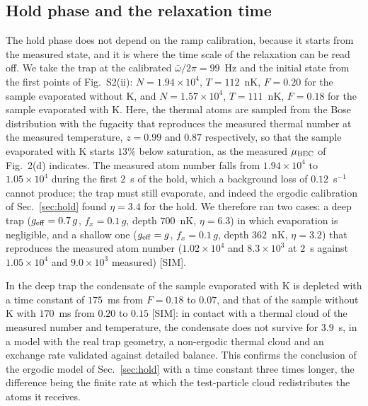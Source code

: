 \subsection{Hold phase and the relaxation time}
The hold phase does not depend on the ramp calibration, because it starts
from the measured state, and it is where the time scale of the relaxation
can be read off. We take the trap at the calibrated $\bar\omega/2\pi=99$~Hz
and the initial state from the first points of Fig.~S2(ii):
$N=1.94\times10^4$, $T=112$~nK, $F=0.20$ for the sample evaporated without
K, and $N=1.57\times10^4$, $T=111$~nK, $F=0.18$ for the sample evaporated
with K. Here, the thermal atoms are sampled from the Bose distribution with
the fugacity that reproduces the measured thermal number at the measured
temperature, $z=0.99$ and $0.87$ respectively, so that the sample evaporated
with K starts $13\%$ below saturation, as the measured $\mu_{\rm BEC}$ of
Fig.~2(d) indicates. The measured atom number falls from $1.94\times10^4$
to $1.05\times10^4$ during the first $2$~s of the hold, which a background
loss of $0.12$~s$^{-1}$ cannot produce; the trap must still evaporate, and
indeed the ergodic calibration of Sec.~\ref{sec:hold} found
$\eta=3.4$ for the hold. We therefore ran two cases: a deep trap
($g_{\rm eff}=0.7\,g$, $f_x=0.1\,g$, depth $700$~nK, $\eta=6.3$) in which
evaporation is negligible, and a shallow one ($g_{\rm eff}=g$,
$f_x=0.1\,g$, depth $362$~nK, $\eta=3.2$) that reproduces the measured
atom number ($1.02\times10^4$ and $8.3\times10^3$ at $2$~s against
$1.05\times10^4$ and $9.0\times10^3$ measured) [SIM].

In the deep trap the condensate of the sample evaporated with K is depleted
with a time constant of $175$~ms from $F=0.18$ to $0.07$, and that of the
sample without K with $170$~ms from $0.20$ to $0.15$ [SIM]: in contact with
a thermal cloud of the measured number and temperature, the condensate
does not survive for $3.9$~s, in a model with the real trap geometry, a
non-ergodic thermal cloud and an exchange rate validated against detailed
balance. This confirms the conclusion of the ergodic model of
Sec.~\ref{sec:hold} with a time constant three times longer, the difference
being the finite rate at which the test-particle cloud redistributes the
atoms it receives.

